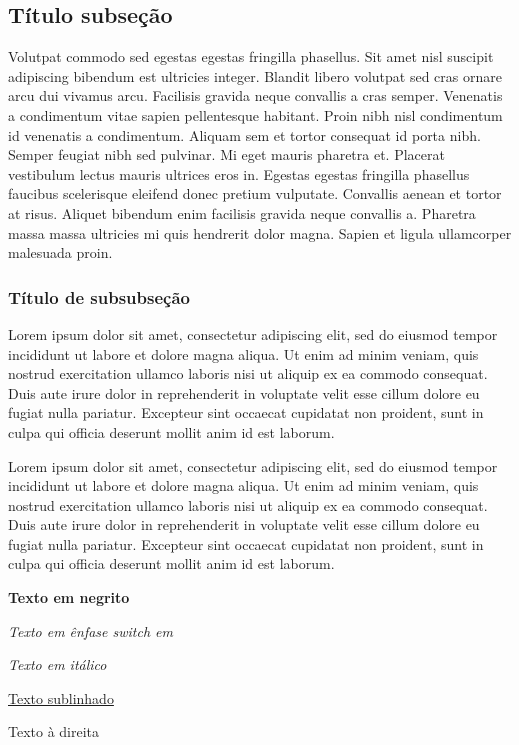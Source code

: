 \documentclass[12pt]{article}
\begin{document}
		\subsection{Título subseção}
		\label{subsec:tit_subsec}
			Volutpat commodo sed egestas egestas fringilla phasellus. Sit amet nisl suscipit adipiscing bibendum est ultricies integer. Blandit libero volutpat sed cras ornare arcu dui vivamus arcu. Facilisis gravida neque convallis a cras semper. Venenatis a condimentum vitae sapien pellentesque habitant. Proin nibh nisl condimentum id venenatis a condimentum. Aliquam sem et tortor consequat id porta nibh. Semper feugiat nibh sed pulvinar. Mi eget mauris pharetra et. Placerat vestibulum lectus mauris ultrices eros in. Egestas egestas fringilla phasellus faucibus scelerisque eleifend donec pretium vulputate. Convallis aenean et tortor at risus. Aliquet bibendum enim facilisis gravida neque convallis a. Pharetra massa massa ultricies mi quis hendrerit dolor magna. Sapien et ligula ullamcorper malesuada proin.
		\subsubsection{Título de subsubseção}
			Lorem ipsum dolor sit amet, consectetur adipiscing elit, sed do eiusmod tempor incididunt ut labore et dolore magna aliqua. Ut enim ad minim veniam, quis nostrud exercitation ullamco laboris nisi ut aliquip ex ea commodo consequat. Duis aute irure dolor in reprehenderit in voluptate velit esse cillum dolore eu fugiat nulla pariatur. Excepteur sint occaecat cupidatat non proident, sunt in culpa qui officia deserunt mollit anim id est laborum.
			
			Lorem ipsum dolor sit amet, consectetur adipiscing elit, sed do eiusmod tempor incididunt ut labore et dolore magna aliqua. Ut enim ad minim veniam, quis nostrud exercitation ullamco laboris nisi ut aliquip ex ea commodo consequat. Duis aute irure dolor in reprehenderit in voluptate velit esse cillum dolore eu fugiat nulla pariatur. Excepteur sint occaecat cupidatat non proident, sunt in culpa qui officia deserunt mollit anim id est laborum.
		\newpage %

	\textbf{Texto em negrito}
	
	{\em Texto em ênfase switch em}
	
	\textit{Texto em itálico}
	
	\underline{Texto sublinhado}
	
	\begin{flushright}
		Texto à direita
	\end{flushright}
	
\end{document}

